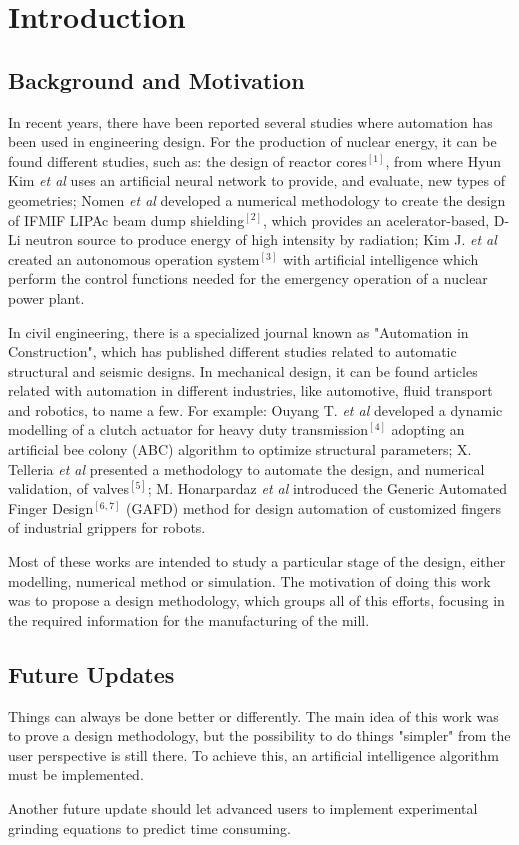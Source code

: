 \section{Introduction} 

\subsection{Background and Motivation}

In recent years, there have been reported several studies where automation has been used in engineering design. For the production of nuclear energy, it can be found different studies, such as: the design of reactor cores$^{[1]}$, from where Hyun Kim \textit{et al} uses an artificial neural network to provide, and evaluate, new types of geometries; Nomen \textit{et al} developed a numerical methodology to create the design of IFMIF LIPAc beam dump shielding$^{[2]}$, which provides an acelerator-based, D-Li neutron source to produce energy of high intensity by radiation; Kim J. \textit{et al} created an autonomous operation system$^{[3]}$ with artificial intelligence which perform the control functions needed for the emergency operation of a nuclear power plant.


    In civil engineering, there is a specialized journal known as "Automation in Construction", which has published different studies related to automatic structural and seismic designs. In mechanical design, it can be found articles related with automation in different industries, like automotive, fluid transport and robotics, to name a few. For example: Ouyang T. \textit{et al} developed a dynamic modelling of a clutch actuator for heavy duty transmission$^{[4]}$ adopting an artificial bee colony (ABC) algorithm to optimize structural parameters; X. Telleria \textit{et al} presented a methodology to automate the design, and numerical validation, of valves$^{[5]}$; M. Honarpardaz \textit{et al} introduced the Generic Automated Finger Design$^{[6, 7]}$ (GAFD) method for design automation of customized fingers of industrial grippers for robots. 

   Most of these works are intended to study a particular stage of the design, either modelling, numerical method or simulation. The motivation of doing this work was to propose a design methodology, which groups all of this efforts, focusing in the required information for the manufacturing of the mill.
   
\subsection{Future Updates}

Things can always be done better or differently. The main idea of this work was to prove a design methodology, but the possibility to do things "simpler" from the user perspective is still there. To achieve this, an artificial intelligence algorithm must be implemented. 

    Another future update should let advanced users to implement experimental grinding equations to predict time consuming.